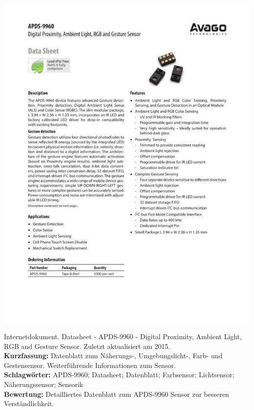{
\begin{minipage}{0.38\textwidth}
	\includegraphics[width=\linewidth]{images/Avago.jpg}
\end{minipage}
\hfill
\begin{minipage}{0.6\textwidth}
Internetdokument. Datasheet - APDS-9960 - Digital Proximity, Ambient Light, RGB and Gesture Sensor. Zuletzt aktualisiert am 2015.
\\ \textbf{Kurzfassung:}
Datenblatt zum Näherungs-, Umgebungslicht-, Farb- und Gestensensor.
Weiterführende Informationen zum Sensor.
\\ \textbf{Schlagwörter:}
APDS-9960; Datasheet; Datenblatt; Farbsensor; Lichtsensor; Näherungssensor; Sensorik
\\ \textbf{Bewertung:}
Detailliertes Datenblatt zum APDS-9960 Sensor zur besseren Verständlichkeit.
\end{minipage}
}

